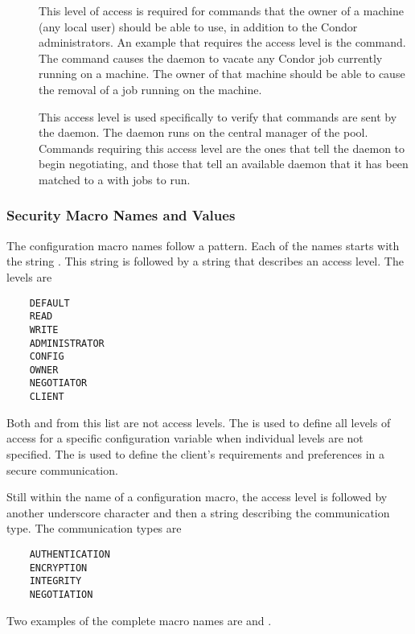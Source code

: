 \begin{description}
\item[] \label{sec-level-owner} This level of access is
   required for commands that the owner of a machine (any local user)
   should be able to use, in addition to the Condor administrators.
   An example that requires the  access level is
   the  command.
   The command causes the  daemon to vacate any
   Condor job currently running on a machine.
   The owner of that machine should be able to cause the removal
   of a job running on the machine.

\item[] \label{sec-level-negotiator} This 
   access level is used specifically to verify that commands are
   sent by the  daemon.
   The  daemon runs on the central manager of
   the pool.
   Commands requiring this access
   level are the ones that tell the  daemon to begin
   negotiating, and those that tell an available  daemon
   that it has been matched to a  with jobs to run.

\end{description}

\subsubsection{\label{sec:Security-NamesValues} Security Macro Names and Values}

The configuration macro names follow a pattern.
Each of the names starts with the string
.
This string is followed by a string that describes an
access level.
The levels are
\begin{verbatim}
    DEFAULT
    READ
    WRITE
    ADMINISTRATOR
    CONFIG
    OWNER
    NEGOTIATOR
    CLIENT
\end{verbatim}

Both  and  
from this list are not access levels.
The  is used to define all levels of access
for a specific configuration variable when individual levels
are not specified.
The  is used to define the client's requirements
and preferences in a secure communication.

Still within the name of a configuration macro,
the access level is followed by another underscore
character and then a string describing the communication type.
The communication types are
\begin{verbatim}
    AUTHENTICATION
    ENCRYPTION
    INTEGRITY
    NEGOTIATION
\end{verbatim}
Two examples of the complete macro names are
and
.

